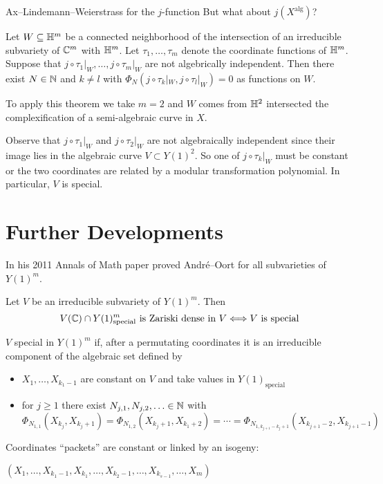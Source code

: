 \documentclass{beamer}
\begin{document}
\begin{frame}{Ax--Lindemann--Weierstrass for the $j$-function}
  But what about $j(X^{\mathrm{alg}})$?

  \begin{theorem}[Pila, 2011]
    Let $W\subseteq{\mathbb{H}}^m$ be a connected neighborhood of the
    intersection of an
    irreducible subvariety of ${\mathbb{C}}^m$ with ${\mathbb{H}}^m$.
    Let $\tau_1,\ldots,\tau_m$ denote the coordinate functions of ${\mathbb{H}}^m$.
    Suppose that $j\circ {\tau_1|}_{W},\ldots,j\circ {\tau_m}|_{W}$
    are \alert{not} algebrically independent.
    Then there exist $N\in{\mathbb{N}}$ and 
    $k\not=l$ with $\Phi_N(j\circ \tau_k|_W,j\circ \tau_l|_W)=0$ as
    functions on $W$.    
  \end{theorem}
  \vspace{-.2cm}
  
  To apply this theorem we take $m=2$ and  $W$ comes from ${\mathbb{H}}^2$
  intersected the complexification of a semi-algebraic curve in $X$.
  
  Observe that $j\circ \tau_1|_W$ and $j\circ \tau_2|_W$ are not
  algebraically independent since their image lies in the algebraic curve
  $V\subset Y(1)^2$.
  So one of $j\circ \tau_k|_W$ must be constant or the two coordinates
  are related by a modular transformation polynomial. In particular,
  $V$ is special.  
\end{frame}

\section{Further Developments}

\begin{frame}
  In his 2011 Annals of Math paper proved Andr\'e--Oort for
  all subvarieties of $Y(1)^m$.

  \begin{theorem}[Pila]
    Let $V$ be an irreducible subvariety of $Y(1)^m$. Then
    $$V({\mathbb{C}})\cap
    Y(1)^{m}_{\mathrm{special}}\text{ is Zariski dense in
      $V$}\Longleftrightarrow V\text{ is special}$$
  \end{theorem}

  $V$ special in $Y(1)^m$ if, after a  permutating coordinates
  it is an irreducible component of the algebraic set defined by
  \begin{itemize}
  \item $X_{1},\ldots,X_{k_1-1}$ are constant on $V$ and take values in
    $Y(1)_{\mathrm{special}}$
  \item for $j\ge 1$ there exist $N_{j,1},N_{j,2},\ldots\in{\mathbb{N}}$ with 
    $\Phi_{N_{1,1}}(X_{k_j},X_{k_j+1})=\Phi_{N_{1,2}}(X_{k_j+1},X_{k_1+2})
    = \cdots =\Phi_{N_{1,k_{j+1}-k_j+1}}(X_{k_{j+1}-2},X_{k_{j+1}-1})$
  \end{itemize}
  Coordinates ``packets'' are constant or linked by an isogeny:
  \vspace{-.2cm}
  \begin{center}
  $(X_1,\ldots,X_{k_1-1},X_{k_1},\ldots,X_{k_2-1},\ldots,
  X_{k_{s-1}},\ldots,X_m)$      
  \end{center}  
\end{frame}
\end{document}
